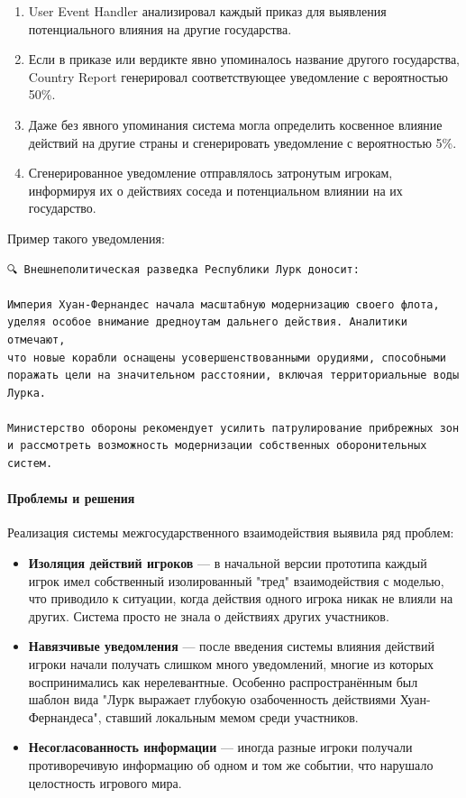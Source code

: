 \begin{enumerate}
    \item User Event Handler анализировал каждый приказ для выявления потенциального влияния на другие государства.

    \item Если в приказе или вердикте явно упоминалось название другого государства, Country Report генерировал соответствующее уведомление с вероятностью 50\%.

    \item Даже без явного упоминания система могла определить косвенное влияние действий на другие страны и сгенерировать уведомление с вероятностью 5\%.

    \item Сгенерированное уведомление отправлялось затронутым игрокам, информируя их о действиях соседа и потенциальном влиянии на их государство.
\end{enumerate}

Пример такого уведомления:

\begin{verbatim}
🔍 Внешнеполитическая разведка Республики Лурк доносит:

Империя Хуан-Фернандес начала масштабную модернизацию своего флота,
уделяя особое внимание дредноутам дальнего действия. Аналитики отмечают,
что новые корабли оснащены усовершенствованными орудиями, способными
поражать цели на значительном расстоянии, включая территориальные воды Лурка.

Министерство обороны рекомендует усилить патрулирование прибрежных зон
и рассмотреть возможность модернизации собственных оборонительных систем.
\end{verbatim}

\paragraph{Проблемы и решения}

Реализация системы межгосударственного взаимодействия выявила ряд проблем:

\begin{itemize}
    \item \textbf{Изоляция действий игроков} — в начальной версии прототипа каждый игрок имел собственный изолированный "{}тред"{} взаимодействия с моделью, что приводило к ситуации, когда действия одного игрока никак не влияли на других. Система просто не знала о действиях других участников.

    \item \textbf{Навязчивые уведомления} — после введения системы влияния действий игроки начали получать слишком много уведомлений, многие из которых воспринимались как нерелевантные. Особенно распространённым был шаблон вида "{}Лурк выражает глубокую озабоченность действиями Хуан-Фернандеса"{}, ставший локальным мемом среди участников.

    \item \textbf{Несогласованность информации} — иногда разные игроки получали противоречивую информацию об одном и том же событии, что нарушало целостность игрового мира.
\end{itemize}

